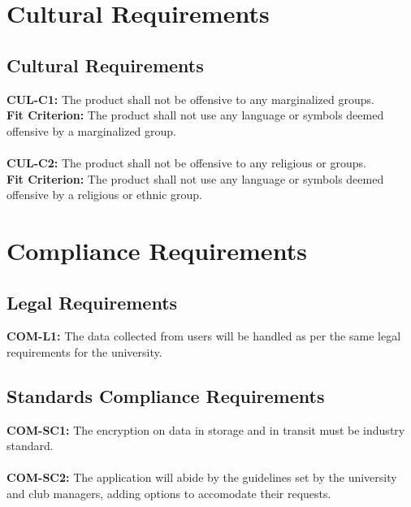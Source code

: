 \documentclass[12pt]{article}
\begin{document}
\section{Cultural Requirements}
\subsection{Cultural Requirements}
  \textbf{CUL-C1:} The product shall not be offensive to any marginalized groups.\\
  \textbf{Fit Criterion:} The product shall not use any language or symbols deemed offensive by a marginalized group.\\\\
  \textbf{CUL-C2:} The product shall not be offensive to any religious or groups.\\
  \textbf{Fit Criterion:} The product shall not use any language or symbols deemed offensive by a religious or ethnic group.\\

\section{Compliance Requirements}
\subsection{Legal Requirements}
  \textbf{COM-L1:} The data collected from users will be handled as per the same legal requirements for the university.\\
\subsection{Standards Compliance Requirements}
  \textbf{COM-SC1:} The encryption on data in storage and in transit must be industry standard.\\\\
  \textbf{COM-SC2:} The application will abide by the guidelines set by the university and club managers, adding options to accomodate their requests.\\
\end{document}
